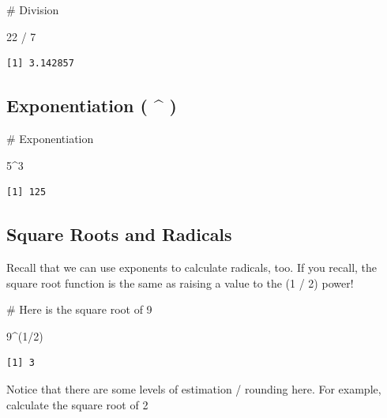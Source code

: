 \documentclass[
  letterpaper,
  DIV=11,
  numbers=noendperiod]{scrreprt}
\newenvironment{Shaded}{\begin{snugshade}}{\end{snugshade}}
\newcommand{\CommentTok}[1]{\textcolor[rgb]{0.37,0.37,0.37}{#1}}
\newcommand{\DecValTok}[1]{\textcolor[rgb]{0.68,0.00,0.00}{#1}}
\newcommand{\NormalTok}[1]{\textcolor[rgb]{0.00,0.23,0.31}{#1}}
\newcommand{\SpecialCharTok}[1]{\textcolor[rgb]{0.37,0.37,0.37}{#1}}
\begin{document}
\begin{Shaded}
\begin{Highlighting}[]
\CommentTok{\# Division}

\DecValTok{22} \SpecialCharTok{/} \DecValTok{7}
\end{Highlighting}
\end{Shaded}

\begin{verbatim}
[1] 3.142857
\end{verbatim}

\subsection*{Exponentiation ( \^{} )}\label{exponentiation}

\begin{Shaded}
\begin{Highlighting}[]
\CommentTok{\# Exponentiation}

\DecValTok{5}\SpecialCharTok{\^{}}\DecValTok{3}
\end{Highlighting}
\end{Shaded}

\begin{verbatim}
[1] 125
\end{verbatim}

\subsection*{Square Roots and Radicals}\label{square-roots-and-radicals}

Recall that we can use exponents to calculate radicals, too. If you
recall, the square root function is the same as raising a value to the
(1 / 2) power!

\begin{Shaded}
\begin{Highlighting}[]
\CommentTok{\# Here is the square root of 9}

\DecValTok{9}\SpecialCharTok{\^{}}\NormalTok{(}\DecValTok{1}\SpecialCharTok{/}\DecValTok{2}\NormalTok{)}
\end{Highlighting}
\end{Shaded}

\begin{verbatim}
[1] 3
\end{verbatim}

Notice that there are some levels of estimation / rounding here. For
example, calculate the square root of 2
\end{document}
